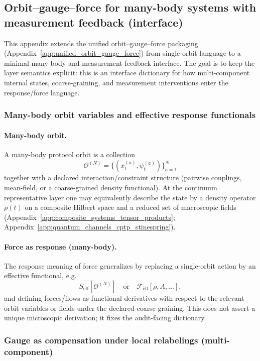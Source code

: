 \subsection{Orbit--gauge--force for many-body systems with measurement feedback (interface)}
\label{app:orbit_gauge_force_manybody_measurement_feedback}

This appendix extends the unified orbit--gauge--force packaging (Appendix~\ref{app:unified_orbit_gauge_force}) from single-orbit language to a minimal many-body and measurement-feedback interface.
The goal is to keep the layer semantics explicit: this is an interface dictionary for how multi-component internal states, coarse-graining, and measurement interventions enter the response/force language.

\subsubsection{Many-body orbit variables and effective response functionals}
\paragraph{Many-body orbit.}
\InterfaceTag A many-body protocol orbit is a collection
\[
\mathcal{O}^{(N)}=\bigl\{(x_t^{(a)},\psi_t^{(a)})\bigr\}_{a=1}^N
\]
together with a declared interaction/constraint structure (pairwise couplings, mean-field, or a coarse-grained density functional).
At the continuum representative layer one may equivalently describe the state by a density operator $\rho(t)$ on a composite Hilbert space and a reduced set of macroscopic fields (Appendix~\ref{app:composite_systems_tensor_products}; Appendix~\ref{app:quantum_channels_cptp_stinespring}).

\paragraph{Force as response (many-body).}
\InterfaceTag The response meaning of force generalizes by replacing a single-orbit action by an effective functional, e.g.
\[
S_{\mathrm{eff}}[\mathcal{O}^{(N)}]\quad\text{or}\quad \mathcal{F}_{\mathrm{eff}}[\rho,A,\ldots],
\]
and defining forces/flows as functional derivatives with respect to the relevant orbit variables or fields under the declared coarse-graining.
This does not assert a unique microscopic derivation; it fixes the audit-facing dictionary.

\subsubsection{Gauge as compensation under local relabelings (multi-component)}
